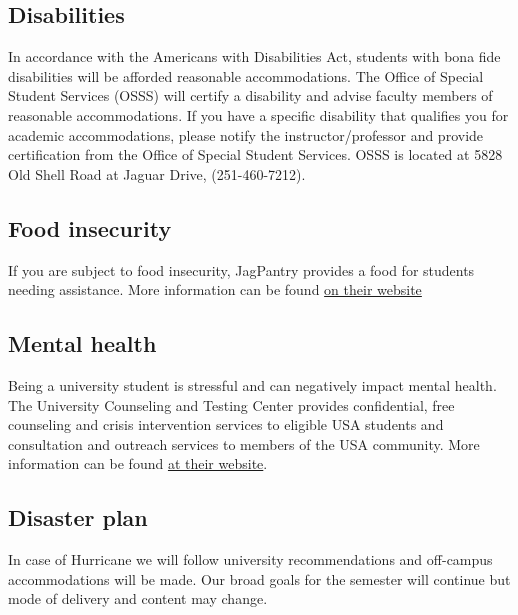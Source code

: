 \documentclass[11pt,]{article}
\begin{document}
\hypertarget{disabilities}{%
\subsection{Disabilities}\label{disabilities}}

In accordance with the Americans with Disabilities Act, students with
bona fide disabilities will be afforded reasonable accommodations. The
Office of Special Student Services (OSSS) will certify a disability and
advise faculty members of reasonable accommodations. If you have a
specific disability that qualifies you for academic accommodations,
please notify the instructor/professor and provide certification from
the Office of Special Student Services. OSSS is located at 5828 Old
Shell Road at Jaguar Drive, (251-460-7212).

\hypertarget{food-insecurity}{%
\subsection{Food insecurity}\label{food-insecurity}}

If you are subject to food insecurity, JagPantry provides a food for
students needing assistance. More information can be found
\href{https://www.southalabama.edu/departments/sga/foodpantry.html}{on
their website}

\hypertarget{mental-health}{%
\subsection{Mental health}\label{mental-health}}

Being a university student is stressful and can negatively impact mental
health. The University Counseling and Testing Center provides
confidential, free counseling and crisis intervention services to
eligible USA students and consultation and outreach services to members
of the USA community. More information can be found
\href{https://www.southalabama.edu/departments/counseling/}{at their
website}.

\hypertarget{disaster-plan}{%
\subsection{Disaster plan}\label{disaster-plan}}

In case of Hurricane we will follow university recommendations and
off-campus accommodations will be made. Our broad goals for the semester
will continue but mode of delivery and content may change.
\end{document}
